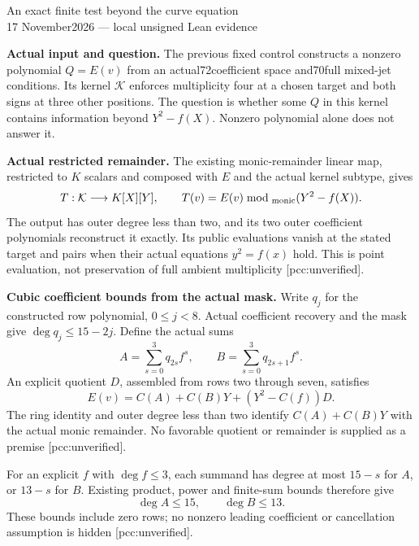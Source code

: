 \documentclass[10pt]{article}
\begin{document}
\begin{center}{\Large An exact finite test beyond the curve equation}\\[4pt]
17 November2026 --- local unsigned Lean evidence\end{center}
\textbf{Actual input and question.}
The previous fixed control constructs a nonzero polynomial $Q=E(v)$
from an actual72coefficient space and70full mixed-jet conditions.
Its kernel $\mathcal K$ enforces multiplicity four at a chosen target and
both signs at three other positions. The question is whether some
$Q$ in this kernel contains information beyond $Y^2-f(X)$.
Nonzero polynomial alone does not answer it.

\textbf{Actual restricted remainder.}
The existing monic-remainder linear map, restricted to $K$ scalars and
composed with $E$ and the actual kernel subtype, gives
\[
 T:\mathcal K\longrightarrow K[X][Y],\qquad
 T(v)=E(v)\bmod_{\rm monic}(Y^2-f(X)).
\]
The output has outer degree less than two, and its two outer coefficient
polynomials reconstruct it exactly. Its public evaluations vanish at the
stated target and pairs when their actual equations $y^2=f(x)$ hold.
This is point evaluation, not preservation of full ambient multiplicity
[pcc:unverified].

\textbf{Cubic coefficient bounds from the actual mask.}
Write $q_j$ for the constructed row polynomial, $0\le j<8$.
Actual coefficient recovery and the mask give
$\deg q_j\le15-2j$. Define the actual sums
\[
 A=\sum_{s=0}^3q_{2s}f^s,\qquad
 B=\sum_{s=0}^3q_{2s+1}f^s.
\]
An explicit quotient $D$, assembled from rows two through seven, satisfies
\[
 E(v)=C(A)+C(B)Y+(Y^2-C(f))D.
\]
The ring identity and outer degree less than two identify
$C(A)+C(B)Y$ with the actual monic remainder. No favorable quotient or
remainder is supplied as a premise [pcc:unverified].

For an explicit $f$ with $\deg f\le3$, each summand has degree at most
$15-s$ for $A$, or $13-s$ for $B$. Existing product, power and finite-sum
bounds therefore give
\[
 \deg A\le15,\qquad \deg B\le13.
\]
These bounds include zero rows; no nonzero leading coefficient or
cancellation assumption is hidden [pcc:unverified].
\end{document}
